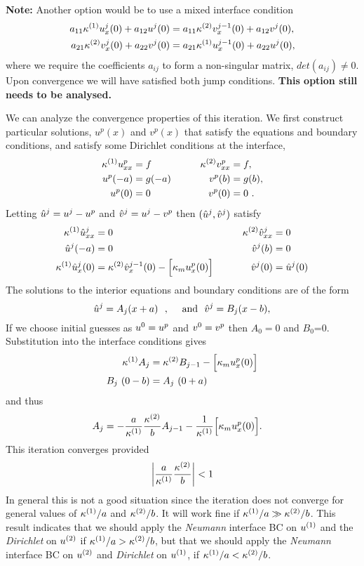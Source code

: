 \documentclass[11pt]{article}
\begin{document}
{\bf Note:} Another option would be to use a mixed interface condition
\begin{align*}
  a_{11} \kappa^{(1)} u^j_x(0) + a_{12} u^{j}(0) &= a_{11} \kappa^{(2)} v^{j-1}_x(0) + a_{12} v^j(0), \\
  a_{21} \kappa^{(2)} v^j_x(0) + a_{22} v^{j}(0) &= a_{21} \kappa^{(1)} u^{j-1}_x(0) + a_{22} u^j(0), 
\end{align*}
where we require the coefficients $a_{ij}$ to form a non-singular matrix, $det(a_{ij})\ne 0$. 
Upon convergence we will have satisfied both jump conditions. {\bf This option still needs to be analysed.}
% 


We can analyze the convergence properties of this iteration. We first construct particular solutions, $u^p(x)$ and
$v^p(x)$ that satisfy the equations and boundary conditions, and satisfy some Dirichlet conditions
at the interface, 
\begin{alignat}{3}
  \kappa^{(1)} u^p_{xx}  &= f \qquad&  \kappa^{(2)} v^p_{xx} &= f ,\\
    u^p(-a)&=g(-a)      \qquad&  v^p(b)&=g(b) ,\\
   u^p(0) &= 0 \qquad& v^p(0) &= 0 ~.
\end{alignat}
Letting $\hat{u}^j=u^j-u^p$ and $\hat{v}^j=u^j-v^p$ then $(\hat{u}^j,\hat{v}^j)$ satisfy 
\begin{alignat}{3}
  \kappa^{(1)} \hat{u}_{xx}^j  &= 0 \qquad&  \kappa^{(2)} \hat{v}_{xx}^j &= 0 \\
    \hat{u}^j(-a)&=0      \qquad&  \hat{v}^j(b)&=0 \\
  \kappa^{(1)} \hat{u}^j_x(0) &= \kappa^{(2)} \hat{v}^{j-1}_x(0) - \Big[\kappa_mu^p_x(0)\Big]   \qquad& \hat{v}^j(0) &= \hat{u}^{j}(0) 
\end{alignat}
The solutions to the interior equations and boundary conditions 
are of the form 
\[ 
\hat{u}^j = A_j (x+a) ~~,~~~~\text{and}~~ \hat{v}^j = B_j(x-b),
\]
If we choose initial guesses as $u^0=u^p$ and $v^0=v^p$ then $A_0=0$ and $B_0$=0. 
Substitution into the interface conditions gives 
\begin{align*}
   \kappa^{(1)} A_j &= \kappa^{(2)} B_{j-1} - \Big[\kappa_mu^p_x(0)\Big] \\
    B_j~(0-b) &= A_j~(0+a)
\end{align*}
and thus
\begin{align*}
   A_j &= - {a\over\kappa^{(1)}}{\kappa^{(2)}\over b} A_{j-1} - {1\over \kappa^{(1)}} \Big[\kappa_mu^p_x(0)\Big] . 
\end{align*}
This iteration converges provided
\begin{equation}
   \left\vert  {a\over\kappa^{(1)}}{\kappa^{(2)}\over b} \right\vert <1 
\end{equation}
In general this is not a good situation since the iteration does not converge for general
values of $\kappa^{(1)}/a$ and $\kappa^{(2)}/b$. It will work fine if $\kappa^{(1)}/a \gg \kappa^{(2)}/b$. 
This result indicates that we should apply the {\em Neumann} interface BC on $u^{(1)}$ and the {\em Dirichlet} on $u^{(2)}$
if $\kappa^{(1)}/a >\kappa^{(2)}/b$,
but that we should apply the {\em Neumann} interface BC on $u^{(2)}$ and {\em Dirichlet} on $u^{(1)}$, if $\kappa^{(1)}/a < \kappa^{(2)}/b$. 
\end{document}

